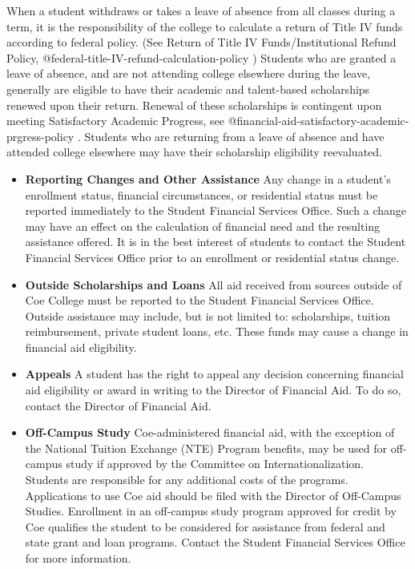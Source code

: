 \documentclass[
  letterpaper,
]{scrbook}
\begin{document}
When a student withdraws or takes a leave of absence from all classes
during a term, it is the responsibility of the college to calculate a
return of Title IV funds according to federal policy. (See Return of
Title IV Funds/Institutional Refund Policy,
@federal-title-IV-refund-calculation-policy ) Students who are granted a
leave of absence, and are not attending college elsewhere during the
leave, generally are eligible to have their academic and talent-based
scholarships renewed upon their return. Renewal of these scholarships is
contingent upon meeting Satisfactory Academic Progress, see
@financial-aid-satisfactory-academic-prgress-policy . Students who are
returning from a leave of absence and have attended college elsewhere
may have their scholarship eligibility reevaluated.

\begin{itemize}
\item
  \textbf{Reporting Changes and Other Assistance} Any change in a
  student's enrollment status, financial circumstances, or residential
  status must be reported immediately to the Student Financial Services
  Office. Such a change may have an effect on the calculation of
  financial need and the resulting assistance offered. It is in the best
  interest of students to contact the Student Financial Services Office
  prior to an enrollment or residential status change.
\item
  \textbf{Outside Scholarships and Loans} All aid received from sources
  outside of Coe College must be reported to the Student Financial
  Services Office. Outside assistance may include, but is not limited
  to: scholarships, tuition reimbursement, private student loans, etc.
  These funds may cause a change in financial aid eligibility.
\item
  \textbf{Appeals} A student has the right to appeal any decision
  concerning financial aid eligibility or award in writing to the
  Director of Financial Aid. To do so, contact the Director of Financial
  Aid.
\item
  \textbf{Off-Campus Study} Coe-administered financial aid, with the
  exception of the National Tuition Exchange (NTE) Program benefits, may
  be used for off-campus study if approved by the Committee on
  Internationalization. Students are responsible for any additional
  costs of the programs. Applications to use Coe aid should be filed
  with the Director of Off-Campus Studies. Enrollment in an off-campus
  study program approved for credit by Coe qualifies the student to be
  considered for assistance from federal and state grant and loan
  programs. Contact the Student Financial Services Office for more
  information.
\end{itemize}
\end{document}
